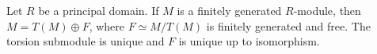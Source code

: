
\begin{theorem}
	\label{thm:free+torsion}
	Let $R$ be a principal domain. 
	If $M$ is a finitely generated $R$-module, then $M=T(M)\oplus F$, where
	$F\simeq M/T(M)$ is finitely generated and free. The torsion submodule
	is unique and $F$ is unique up to isomorphism. 
\end{theorem}


